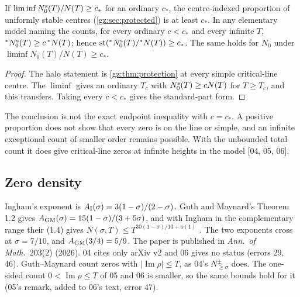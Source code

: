 \documentclass[11pt,a4paper]{article}
\numberwithin{equation}{section}
\theoremstyle{definition}
\theoremstyle{remark}
\renewcommand{\Im}{\operatorname{Im}}
\newcommand{\st}{\operatorname{st}}
\newcommand{\src}[1]{\textup{[#1]}}
\begin{document}
\begin{corollary}[Stable proportions \src{04, 05, 06}]\label{gz:cor:stableproportion}
If $\liminf N_0^{\rm s}(T)/N(T)\ge c_*$ for an ordinary $c_*$, the
centre-indexed proportion of uniformly stable centres
(\cref{gz:sec:protected}) is at least $c_*$. In any elementary model naming
the counts, for every ordinary $c<c_*$ and every infinite $T$,
${}^*N_0^{\rm s}(T)\ge c\,{}^*N(T)$; hence
$\st({}^*N_0^{\rm s}(T)/{}^*N(T))\ge c_*$. The same holds for $N_0$ under
$\liminf N_0(T)/N(T)\ge c_*$.
\end{corollary}
\begin{proof}
The halo statement is \cref{gz:thm:protection} at every simple
critical-line centre. The $\liminf$ gives an ordinary $T_c$ with
$N_0^{\rm s}(T)\ge cN(T)$ for $T\ge T_c$, and this transfers. Taking every
$c<c_*$ gives the standard-part form.
\end{proof}
The conclusion is not the exact endpoint inequality with $c=c_*$. A
positive proportion does not show that every zero is on the line or simple,
and an infinite exceptional count of smaller order remains possible. With
the unbounded total count it does give critical-line zeros at infinite
heights in the model \src{04, 05, 06}.

\subsection{Zero density}\label{gz:sec:density}
Ingham's exponent is $A_{\rm I}(\sigma)=3(1-\sigma)/(2-\sigma)$. Guth and
Maynard's Theorem 1.2 gives $A_{\rm GM}(\sigma)=15(1-\sigma)/(3+5\sigma)$,
and with Ingham in the complementary range their (1.4) gives
$N(\sigma,T)\le T^{30(1-\sigma)/13+o(1)}$ \cite{GM}. The two exponents cross
at $\sigma=7/10$, and $A_{\rm GM}(3/4)=5/9$. The paper is published in
\emph{Ann.\ of Math.}\ 203(2) (2026). 04 cites only arXiv v2 and 06 gives no
status (errors 29, 46). Guth--Maynard count zeros with $|\Im\rho|\le T$, as
04's $N^\pm_{\ge\sigma}$ does. The one-sided count $0<\Im\rho\le T$ of 05 and
06 is smaller, so the same bounds hold for it (05's remark, added to 06's
text, error 47).
\end{document}

